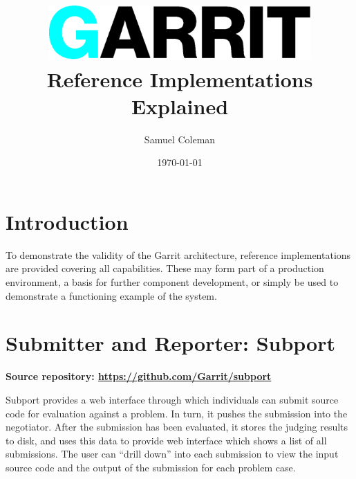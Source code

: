\documentclass[11pt,letterpaper]{article}
\begin{document}
\title{\includegraphics[width=0.75\textwidth]{logo.eps}\\
Reference Implementations Explained}
\author{Samuel Coleman}
\date{\today}

\hypersetup{pageanchor=false}
\begin{titlepage}

\maketitle
\thispagestyle{empty}

\end{titlepage}
\hypersetup{pageanchor=true}

\tableofcontents

\newpage

\section{Introduction}
\label{introduction}

To demonstrate the validity of the Garrit architecture, reference
implementations are provided covering all capabilities. These may form part of
a production environment, a basis for further component development, or simply
be used to demonstrate a functioning example of the system.

\section{Submitter and Reporter: Subport}
\label{subport}

\textbf{Source repository: \url{https://github.com/Garrit/subport}}

Subport provides a web interface through which individuals can submit source
code for evaluation against a problem. In turn, it pushes the submission into
the negotiator. After the submission has been evaluated, it stores the judging
results to disk, and uses this data to provide web interface which shows a list
of all submissions. The user can ``drill down'' into each submission to view
the input source code and the output of the submission for each problem case.
\end{document}
